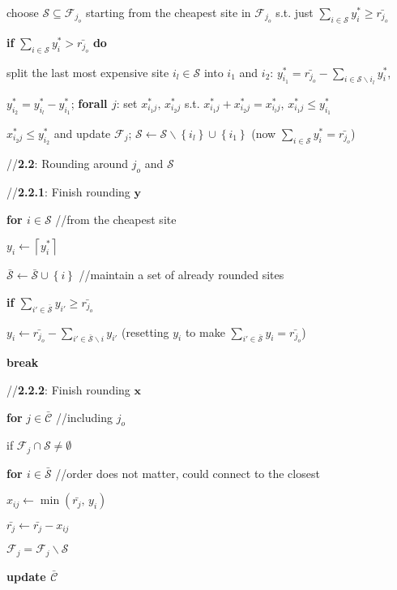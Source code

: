 \documentclass[10pt]{llncs}
\begin{document}
\begin{algorithm}[H]
\qquad{}choose $\mathcal{S}\subseteq\mathcal{F}_{j_{o}}$ starting
from the cheapest site in $\mathcal{F}_{j_{o}}$ s.t. just $\sum_{i\in\mathcal{S}}y_{i}^{*}\geq\bar{r_{j_{o}}}$

\qquad{}\textbf{if} $\sum_{i\in\mathcal{S}}y_{i}^{*}>\bar{r_{j_{o}}}$
\textbf{do}

\qquad{}\qquad{}split the last most expensive site $i_{l}\in\mathcal{S}$
into $i_{1}$ and $i_{2}$: $y_{i_{1}}^{*}=\bar{r_{j_{o}}}-\sum_{i\in\mathcal{S}\backslash i_{l}}y_{i}^{*}$, 

\qquad{}\qquad{}$y_{i_{2}}^{*}=y_{i_{l}}^{*}-y_{i_{1}}^{*}$;\textbf{
forall $j$}:\textbf{ }set $x_{i_{1}j}^{*},\, x_{i_{2}j}^{*}$ s.t.
$x_{i_{1}j}^{*}+x_{i_{2}j}^{*}=x_{i_{l}j}^{*}$, $x_{i_{1}j}^{*}\leq y_{i_{1}}^{*}$ 

\qquad{}\qquad{}$x_{i_{2}j}^{*}\leq y_{i_{2}}^{*}$ and update $\mathcal{F}_{j}$;\textbf{
}$\mathcal{S}\leftarrow\mathcal{S}\backslash\left\{ i_{l}\right\} \cup\left\{ i_{1}\right\} $
(now $\sum_{i\in\mathcal{S}}y_{i}^{*}=\bar{r_{j_{o}}}$)\medskip{}


\qquad{}//\textbf{2.2}: Rounding around $j_{o}$ and $\mathcal{S}$

\qquad{}//\textbf{2.2.1}: Finish rounding $\boldsymbol{y}$

\qquad{}\textbf{for $i\in\mathcal{S}$ }//from the cheapest site

\qquad{}\qquad{}$y_{i}\leftarrow\left\lceil y_{i}^{*}\right\rceil $ 

\qquad{}\qquad{}$\bar{\mathcal{S}}\leftarrow\bar{\mathcal{S}}\cup\left\{ i\right\} $
//maintain a set of already rounded sites

\qquad{}\qquad{}\textbf{if $\sum_{i'\in\bar{\mathcal{S}}}y_{i'}\geq\bar{r_{j_{o}}}$}

\qquad{}\qquad{}\qquad{}$y_{i}\leftarrow\bar{r_{j_{o}}}-\sum_{i'\in\bar{\mathcal{S}}\backslash i}y_{i'}$
(resetting $y_{i}$ to make $\sum_{i'\in\bar{\mathcal{S}}}y_{i}=\bar{r_{j_{o}}}$)

\qquad{}\qquad{}\qquad{}\textbf{break}\medskip{}


\qquad{}//\textbf{2.2.2}: Finish rounding $\boldsymbol{x}$

\qquad{}\textbf{for} $j\in\bar{\mathcal{C}}$ //including $j_{o}$

\qquad{}\qquad{}if $\mathcal{F}_{j}\cap\mathcal{S}\neq\emptyset$

\qquad{}\qquad{}\qquad{}\textbf{for $i\in\bar{\mathcal{S}}$ }//order
does not matter, could connect to the closest

\qquad{}\qquad{}\qquad{}\qquad{}$x_{ij}\leftarrow\min\left(\bar{r_{j}},\, y_{i}\right)$

\qquad{}\qquad{}\qquad{}\qquad{}$\bar{r_{j}}\leftarrow\bar{r_{j}}-x_{ij}$

\qquad{}\qquad{}$\mathcal{F}_{j}=\mathcal{F}_{j}\backslash\mathcal{S}$

\qquad{}\textbf{update $\bar{\mathcal{C}}$}
\end{algorithm}
\end{document}
